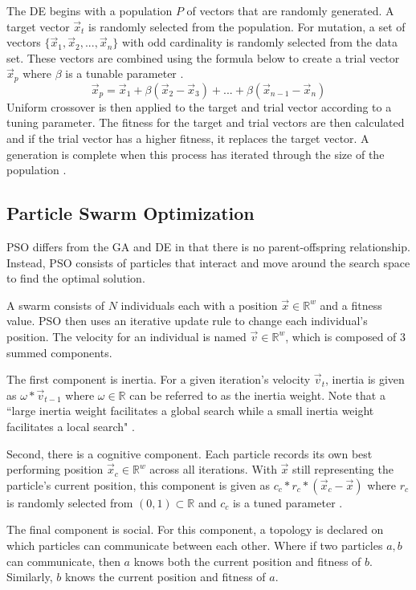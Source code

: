 \documentclass[twoside,11pt]{article}
\newcommand{\Rw}{\mathbb{R}^w }
\begin{document}
	The DE begins with a population $P$ of vectors that are randomly generated. 
	A target vector $\vec{x}_t$ is randomly selected from the population. 
	For mutation, a set of vectors $\{ \vec{x}_1, \vec{x}_2, ..., \vec{x}_n \}$ with odd cardinality is randomly selected from the data set. 
	These vectors are combined using the formula below to create a trial vector $\vec{x}_p$ where $\beta$ is a tunable parameter \citep{price2006differential}. 
	$$\vec{x}_p = \vec{x}_1 + \beta(\vec{x}_2 - \vec{x}_3) + ... + \beta(\vec{x}_{n-1} - \vec{x}_n)$$
	Uniform crossover is then applied to the target and trial vector according to a tuning parameter. 
	The fitness for the target and trial vectors are then calculated and if the trial vector has a higher fitness, it replaces the target vector. 
	A generation is complete when this process has iterated through the size of the population \citep{price2006differential}.

\subsection{Particle Swarm Optimization}

	PSO differs from the GA and DE in that there is no parent-offspring relationship. Instead, PSO consists of particles that interact and move around the search space to find the optimal solution.

	A swarm consists of $N$ individuals each with a position $\vec{x} \in \Rw$ and a fitness value.
	PSO then uses an iterative update rule to change each individual's position. The velocity for an individual is named $\vec{v} \in \Rw$, which is composed of 3 summed components.

	The first component is inertia. For a given iteration's velocity $\vec{v}_t$, inertia is given as $\omega * \vec{v}_{t-1}$ where $\omega \in \mathbb{R}$ can be referred to as the inertia weight. Note that a ``large inertia weight facilitates a global search while a small inertia weight facilitates a local search" \citep{empirical-pso}.

	Second, there is a cognitive component.
	Each particle records its own best performing position $\vec{x}_c \in \Rw$ across all iterations.
	With $\vec{x}$ still representing the particle's current position, this component is given as $c_c * r_c * (\vec{x}_c - \vec{x})$ where $r_c$ is randomly selected from $(0,1) \subset \mathbb{R}$ and $c_c$ is a tuned parameter \citep{og-pso}.

	The final component is social.
	For this component, a topology is declared on which particles can communicate between each other.
	Where if two particles $a,b$ can communicate, then $a$ knows both the current position and fitness of $b$.
	Similarly, $b$ knows the current position and fitness of $a$.
\end{document}
